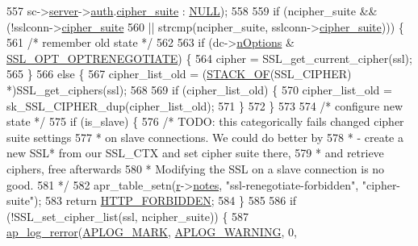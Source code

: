 \begin{DoxyCode}
{557                      sc->\hyperlink{structSSLSrvConfigRec_a7941dbc2f9fa504b3968a4afdc4b96fc}{server}->\hyperlink{structmodssl__ctx__t_a55144723f90510fb094554f7652f0ef0}{auth}.\hyperlink{structmodssl__auth__ctx__t_a9cabbc8c6b3b2b002f73b3add389ab96}{cipher\_suite} : \hyperlink{pcre_8txt_ad7f989d16aa8ca809a36bc392c07fba1}{NULL});
558     
559     \textcolor{keywordflow}{if} (ncipher\_suite && (!sslconn->\hyperlink{structSSLConnRec_ad05c2c70b3f1febdee2a34ca0dbb79fb}{cipher\_suite} 
560                           || strcmp(ncipher\_suite, sslconn->\hyperlink{structSSLConnRec_ad05c2c70b3f1febdee2a34ca0dbb79fb}{cipher\_suite}))) \{
561         \textcolor{comment}{/* remember old state */}
562 
563         \textcolor{keywordflow}{if} (dc->\hyperlink{structSSLDirConfigRec_a50695711c7c4fca0eddbb421e8620b61}{nOptions} & \hyperlink{group__MOD__SSL__PRIVATE_ga1deca31e6a3457860ece6b8ca3c8343e}{SSL\_OPT\_OPTRENEGOTIATE}) \{
564             cipher = SSL\_get\_current\_cipher(ssl);
565         \}
566         \textcolor{keywordflow}{else} \{
567             cipher\_list\_old = (\hyperlink{ssl__engine__init_8c_a8d3ef5dbf93a046b44c0a610b5325b45}{STACK\_OF}(SSL\_CIPHER) *)SSL\_get\_ciphers(ssl);
568 
569             \textcolor{keywordflow}{if} (cipher\_list\_old) \{
570                 cipher\_list\_old = sk\_SSL\_CIPHER\_dup(cipher\_list\_old);
571             \}
572         \}
573 
574         \textcolor{comment}{/* configure new state */}
575         \textcolor{keywordflow}{if} (is\_slave) \{
576             \textcolor{comment}{/* TODO: this categorically fails changed cipher suite settings}
577 \textcolor{comment}{             * on slave connections. We could do better by}
578 \textcolor{comment}{             * - create a new SSL* from our SSL\_CTX and set cipher suite there,}
579 \textcolor{comment}{             *   and retrieve ciphers, free afterwards}
580 \textcolor{comment}{             * Modifying the SSL on a slave connection is no good.}
581 \textcolor{comment}{             */}
582             apr\_table\_setn(\hyperlink{group__APACHE__CORE__CONFIG_ga091cdd45984e865a888a4f8bb8fe107a}{r}->\hyperlink{structrequest__rec_a8be66d4328766cf1da8913c9b51e0e30}{notes}, \textcolor{stringliteral}{"ssl-renegotiate-forbidden"}, \textcolor{stringliteral}{"cipher-suite"});
583             \textcolor{keywordflow}{return} \hyperlink{group__HTTP__Status_ga92646f876056a1e5013e0050496dc04d}{HTTP\_FORBIDDEN};
584         \}
585 
586         \textcolor{keywordflow}{if} (!SSL\_set\_cipher\_list(ssl, ncipher\_suite)) \{
587             \hyperlink{group__APACHE__CORE__LOG_ga4c112558ccffd6b363da102b2052d2a6}{ap\_log\_rerror}(\hyperlink{group__APACHE__CORE__LOG_ga655e126996849bcb82e4e5a14c616f4a}{APLOG\_MARK}, \hyperlink{group__APACHE__CORE__LOG_ga73e14aeff380a8a01c66d528162026fe}{APLOG\_WARNING}, 0, 
}
\end{DoxyCode}
